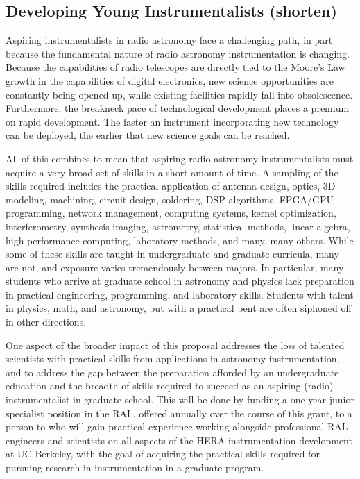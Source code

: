 \documentclass[preprint]{aastex}
\begin{document}
\subsection{Developing Young Instrumentalists (shorten)}
Aspiring instrumentalists in radio astronomy face a challenging path, in part because
the fundamental nature of radio astronomy instrumentation is changing.
Because the capabilities of radio telescopes are directly tied to the Moore's Law
growth in the capabilities of digital electronics,
new science opportunities are constantly being opened up, while existing
facilities rapidly fall into obsolescence.
Furthermore,
the breakneck pace of technological development places a premium on rapid development.
The faster an instrument incorporating new technology can be deployed,
the earlier that new science goals can be reached.

All of this combines to mean that aspiring radio astronomy instrumentalists must acquire a very broad
set of skills in a short amount of time.  A sampling of the skills required includes the practical
application of antenna design, optics,
3D modeling, machining, circuit design, soldering, DSP algorithms, FPGA/GPU programming, network management,
computing systems, kernel optimization, interferometry, synthesis imaging, astrometry, statistical methods, linear
algebra, high-performance
computing, laboratory methods, and many, many others.  While some of these skills are taught
in undergraduate and graduate
curricula, many are not, and exposure varies tremendously between majors.  In particular,
many students who arrive at graduate school in astronomy and physics
lack preparation in
practical engineering, programming, and laboratory skills.  Students with talent in physics, math, and astronomy,
but with a practical bent are often siphoned off in other directions.

One aspect of the broader impact of this proposal addresses the loss of talented
scientists with practical skills from applications in astronomy
instrumentation, and to address the gap between the preparation afforded by an
undergraduate education and the breadth of skills required to succeed as an
aspiring (radio) instrumentalist in graduate school.  This will be done by
funding a one-year junior specialist position in the RAL, offered annually over the course of this grant, to a
person to who
will gain practical experience working alongside professional RAL engineers and scientists
on all aspects of the HERA instrumentation development at UC Berkeley, with the goal of
acquiring the practical skills required for
pursuing research in instrumentation in a graduate program.
\end{document}
